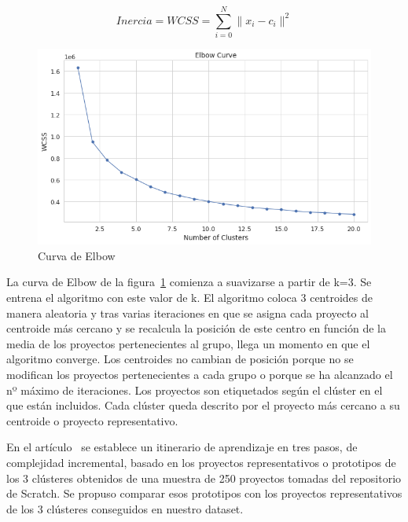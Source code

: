\documentclass[a4paper, 12pt]{book}
\begin{document}
\begin{equation}
    Inercia=WCSS=\sum \limits _{i=0}^{N} \|{x_i-c_i\|^2}
    \label{eq:inercia}
\end{equation}

\begin{figure}
    \centering
    \includegraphics[width=.6\textwidth]{img/elbow_Scratch}
    \caption{Curva de Elbow}
    \label{fig:elbow_Scratch}
\end{figure}

La curva de Elbow de la figura~\ref{fig:elbow_Scratch} comienza a suavizarse a partir de k=3. Se entrena el algoritmo con este valor de k. El algoritmo coloca 3 centroides de manera aleatoria y tras varias iteraciones en que se asigna cada proyecto al centroide más cercano y se recalcula la posición de este centro en función de la media de los proyectos pertenecientes al grupo, llega un momento en que el algoritmo converge. Los centroides no cambian de posición porque no se modifican los proyectos pertenecientes a cada grupo o porque se ha alcanzado el nº máximo de iteraciones. Los proyectos son etiquetados según el clúster en el que están incluidos. Cada clúster queda descrito por el proyecto más cercano a su centroide o proyecto representativo.

En el artículo~\cite{moreno17:_paths} se establece un itinerario de aprendizaje en tres pasos, de complejidad incremental, basado en los proyectos representativos o prototipos de los 3 clústeres obtenidos de una muestra de 250 proyectos tomadas del repositorio de Scratch. Se propuso comparar esos prototipos con los proyectos representativos de los 3 clústeres conseguidos en nuestro dataset.  
\end{document}

